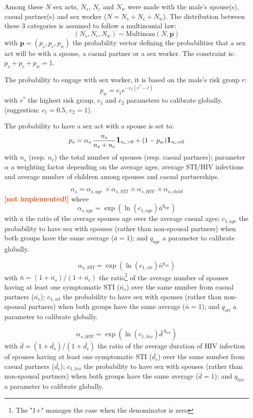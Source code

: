 \documentclass[11pt, onecolumn]{article}
\newcommand{\one}[1]{\textbf{\large{1}}_{#1}}
\newcommand{\warning}[1]{\textbf{\textcolor{OrangeRed}{#1}}}
\begin{document}
Among these $N$ sex acts, $N_s$, $N_c$ and $N_w$ were made with the male's spouse(s), casual partner(s) and sex worker ($N=N_s+N_c+N_w$). The distribution between these 3 categories is assumed to follow a multinomial law: 
$$(N_s,N_c,N_w) \sim \mathrm{Multinom}(N,\mathbf{p}) $$
with $\mathbf{p}=(p_s,p_c,p_w)$ the probability vector defining the probabilities that a sex act will be with a spouse, a casual partner or a sex worker. The constraint is: $p_s+p_c+p_w=1$.

The probability to engage with sex worker, it is based on the male's risk group $r$:
$$ p_w = c_1 e^{-c_2(r^*-r)}$$
with $r^*$ the highest risk group, $c_1$ and $c_2$ parameters to calibrate globally. (suggestion: $c_1=0.5$, $c_2=1$).

The probability to have a sex act with a spouse is set to:
$$p_s = \alpha_s \,\frac{n_s}{n_s+n_c} \one{n_c>0} + (1-p_w)\one{n_c=0}$$
with $n_s$ (resp. $n_c$) the total number of spouses (resp. casual partners); parameter $\alpha$ a weighting factor depending on the average ages, average STI/HIV infections and average number of children among spouses and casual partnerships.

$$\alpha_s = \alpha_{s,age} \,\times  \alpha_{s,STI} \,\times  \alpha_{s,HIV} \,\times  \alpha_{s,child} $$
\warning{[not implemented!]} where
$$ \alpha_{s,age} = \exp(\ln(c_{1,age}) \bar{a}^{q_{age}}) $$
with $\bar{a}$ the ratio of the average spouses age over the average casual ages; $c_{1,age}$ the probability to have sex with spouses (rather than non-spousal partners) when both groups have the same average ($\bar{a}=1$); and $q_{age}$ a parameter to calibrate globally.

$$ \alpha_{s,STI} = \exp(\ln(c_{1,sti}) \bar{n}^{q_{sti}})$$
with $\bar{n} = (1+\bar{n_s})/(1+\bar{n_c})$ the ratio\footnote{The "1+" manages the case when the denominator is zero} of the average number of spouses having at least one symptomatic STI ($\bar{n_s}$) over the same number from casual partners  ($\bar{n_c}$); $c_{1,sit}$ the probability to have sex with spouses (rather than non-spousal partners) when both groups have the same average ($\bar{n}=1$); and $q_{sti}$ a parameter to calibrate globally.

$$ \alpha_{s,HIV} = \exp(\ln(c_{1,hiv}) \bar{d\,}^{q_{hiv}})$$
with $\bar{d} = (1+\bar{d_s})/(1+\bar{d_c})$ the ratio of the average duration of HIV infection of spouses having at least one symptomatic STI ($\bar{d_s}$) over the same number from casual partners  ($\bar{d_c}$); $c_{1,hiv}$ the probability to have sex with spouses (rather than non-spousal partners) when both groups have the same average ($\bar{d}=1$); and $q_{hiv}$ a parameter to calibrate globally.
\end{document}
